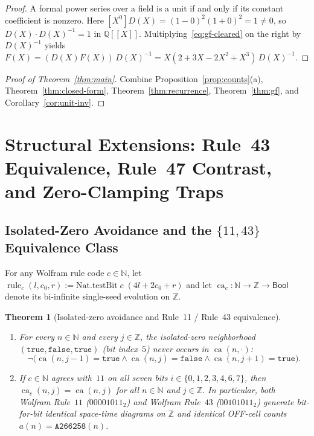 \documentclass[11pt]{article}
\newcommand{\llbracket}{[\![}
\newcommand{\rrbracket}{]\!]}
\newtheorem{theorem}{Theorem}[section]
\theoremstyle{definition}
\newcommand{\N}{\mathbb{N}}
\newcommand{\Z}{\mathbb{Z}}
\newcommand{\Q}{\mathbb{Q}}
\newcommand{\seq}[1]{\texttt{#1}}
\newcommand{\ca}{\operatorname{ca}}
\begin{document}
\begin{proof}
A formal power series over a field is a unit if and only if its constant coefficient is nonzero. Here $[X^0]D(X) = (1 - 0)^2(1 + 0)^2 = 1 \ne 0$, so $D(X) \cdot D(X)^{-1} = 1$ in $\Q\llbracket X \rrbracket$. Multiplying~\eqref{eq:gf-cleared} on the right by $D(X)^{-1}$ yields $F(X) = (D(X) F(X))\,D(X)^{-1} = X(2 + 3X - 2X^2 + X^3)\,D(X)^{-1}$.
\end{proof}

\begin{proof}[Proof of Theorem~\ref{thm:main}]
Combine Proposition~\ref{prop:counts}(a), Theorem~\ref{thm:closed-form}, Theorem~\ref{thm:recurrence}, Theorem~\ref{thm:gf}, and Corollary~\ref{cor:unit-inv}.
\end{proof}

\section{Structural Extensions: Rule~43 Equivalence, Rule~47 Contrast, and Zero-Clamping Traps}

\subsection{Isolated-Zero Avoidance and the \texorpdfstring{$\{11, 43\}$}{\{11, 43\}} Equivalence Class}

For any Wolfram rule code $c \in \N$, let $\operatorname{rule}_c(l, c_0, r) := \mathrm{Nat.testBit}\;c\;(4l + 2c_0 + r)$ and let $\ca_c : \N \to \Z \to \mathsf{Bool}$ denote its bi-infinite single-seed evolution on $\Z$.

\begin{theorem}[Isolated-zero avoidance and Rule~11 / Rule~43 equivalence]
\label{thm:rule43}
\begin{enumerate}
\item[\textup{(a)}] For every $n \in \N$ and every $j \in \Z$, the isolated-zero neighborhood $(\mathtt{true}, \mathtt{false}, \mathtt{true})$ (bit index~$5$) never occurs in $\ca(n, \cdot)$:
\[
\neg\bigl(\ca(n, j - 1) = \mathtt{true} \land \ca(n, j) = \mathtt{false} \land \ca(n, j + 1) = \mathtt{true}\bigr).
\]
\item[\textup{(b)}] If $c \in \N$ agrees with~$11$ on all seven bits $i \in \{0, 1, 2, 3, 4, 6, 7\}$, then $\ca_c(n, j) = \ca(n, j)$ for all $n \in \N$ and $j \in \Z$. In particular, both Wolfram Rule~$11$ ($00001011_2$) and Wolfram Rule~$43$ ($00101011_2$) generate bit-for-bit identical space-time diagrams on $\Z$ and identical OFF-cell counts $a(n) = \seq{A266258}(n)$.
\end{enumerate}
\end{theorem}
\end{document}
